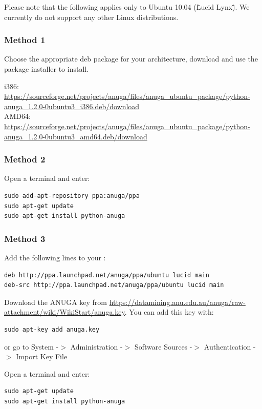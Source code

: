 \documentclass{manual}
\begin{document}
Please note that the following applies only to Ubuntu 10.04 (\"Lucid Lynx\"). We currently do not
support any other Linux distributions.

\subsubsection{Method 1}

Choose the appropriate deb package for your architecture, download and use the package installer to install.

i386: \url{https://sourceforge.net/projects/anuga/files/anuga_ubuntu_package/python-anuga_1.2.0-0ubuntu3_i386.deb/download}\\
AMD64: \url{https://sourceforge.net/projects/anuga/files/anuga_ubuntu_package/python-anuga_1.2.0-0ubuntu3_amd64.deb/download}

\subsubsection{Method 2}

Open a terminal and enter:
\begin{verbatim}
sudo add-apt-repository ppa:anuga/ppa
sudo apt-get update
sudo apt-get install python-anuga
\end{verbatim}

\subsubsection{Method 3}

Add the following lines to your :
\begin{verbatim}
deb http://ppa.launchpad.net/anuga/ppa/ubuntu lucid main
deb-src http://ppa.launchpad.net/anuga/ppa/ubuntu lucid main
\end{verbatim}
Download the ANUGA key from \url{https://datamining.anu.edu.au/anuga/raw-attachment/wiki/WikiStart/anuga.key}. You can add this key with:
\begin{verbatim}
sudo apt-key add anuga.key
\end{verbatim}
or go to System -$>$ Administration -$>$ Software Sources -$>$ Authentication -$>$ Import Key File

Open a terminal and enter:
\begin{verbatim}
sudo apt-get update
sudo apt-get install python-anuga
\end{verbatim}
\end{document}
